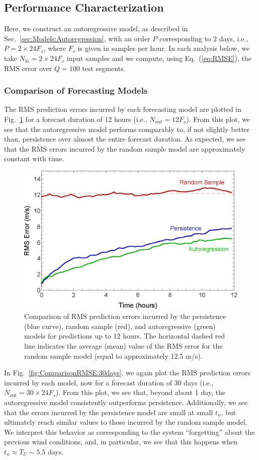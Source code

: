 \documentclass[11pt, oneside]{article}
\newcommand{\figref}[1]{Fig.~\ref{#1}}
\newcommand{\eqnref}[1]{Eq.~(\ref{#1})}
\newcommand{\secref}[1]{Sec.~\ref{#1}}
\begin{document}
\subsection{Performance Characterization}
Here, we construct an autoregressive model, as described in \secref{sec:Models:Autoregression}, with an order $P$ corresponding to 2 days, i.e., $P = 2 \times 24 F_s$, where $F_s$ is given in samples per hour.
In each analysis below, we take $N_\text{in} = 2 \times 24 F_s$ input samples and we compute, using \eqnref{eq:RMSE}, the RMS error over $Q = 100$ test segments.

\subsubsection{Comparison of Forecasting Models}\label{sec:Results:Comparison}
The RMS prediction errors incurred by each forecasting model are plotted in \figref{fig:ComparisonRMSE:12hrs} for a forecast duration of 12 hours (i.e., $N_\text{out} = 12 F_s$).
From this plot, we see that the autoregressive model performs comparably to, if not slightly better than, persistence over almost the entire forecast duration.
As expected, we see that the RMS errors incurred by the random sample model are approximately constant with time.

\begin{figure}[htb]
\centering
\includegraphics[width=0.7\columnwidth]{figures/ComparisonRMSPredictionError_12hrs}
\caption{Comparison of RMS prediction errors incurred by the persistence (blue curve), random sample (red), and autoregressive (green) models for predictions up to 12 hours.
The horizontal dashed red line indicates the average (mean) value of the RMS error for the random sample model (equal to approximately 12.5 m/s).}
\label{fig:ComparisonRMSE:12hrs}
\end{figure}

In \figref{fig:ComparisonRMSE:30days}, we again plot the RMS prediction errors incurred by each model, now for a forecast duration of 30 days (i.e., $N_\text{out} = 30 \times 24 F_s$).
From this plot, we see that, beyond about 1 day, the autoregressive model consistently outperforms persistence.
Additionally, we see that the errors incurred by the persistence model are small at small $t_n$, but ultimately reach similar values to those incurred by the random sample model.
We interpret this behavior as corresponding to the system ``forgetting'' about the previous wind conditions, and, in particular, we see that this happens when $t_n \approx T_U \sim 5.5$ days.
\end{document}
